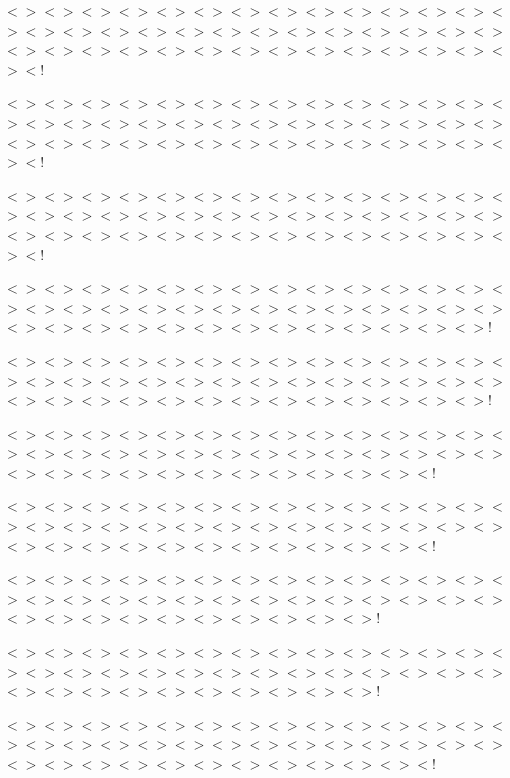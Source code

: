 $<$$>$$<$$>$$<$$>$$<$$>$$<$$>$$<$$>$$<$$>$$<$$>$$<$$>$$<$$>$$<$$>$$<$$>$$<$$>$$<$$>$$<$$>$$<$$>$$<$$>$$<$$>$$<$$>$$<$$>$$<$$>$$<$$>$$<$$>$$<$$>$$<$$>$$<$$>$$<$$>$$<$$>$$<$$>$$<$$>$$<$$>$$<$$>$$<$$>$$<$$>$$<$$>$$<$$>$$<$$>$$<$$>$$<$$>$$<$$>$$<$$>$$<$!

$<$$>$$<$$>$$<$$>$$<$$>$$<$$>$$<$$>$$<$$>$$<$$>$$<$$>$$<$$>$$<$$>$$<$$>$$<$$>$$<$$>$$<$$>$$<$$>$$<$$>$$<$$>$$<$$>$$<$$>$$<$$>$$<$$>$$<$$>$$<$$>$$<$$>$$<$$>$$<$$>$$<$$>$$<$$>$$<$$>$$<$$>$$<$$>$$<$$>$$<$$>$$<$$>$$<$$>$$<$$>$$<$$>$$<$$>$$<$$>$$<$$>$$<$!

$<$$>$$<$$>$$<$$>$$<$$>$$<$$>$$<$$>$$<$$>$$<$$>$$<$$>$$<$$>$$<$$>$$<$$>$$<$$>$$<$$>$$<$$>$$<$$>$$<$$>$$<$$>$$<$$>$$<$$>$$<$$>$$<$$>$$<$$>$$<$$>$$<$$>$$<$$>$$<$$>$$<$$>$$<$$>$$<$$>$$<$$>$$<$$>$$<$$>$$<$$>$$<$$>$$<$$>$$<$$>$$<$$>$$<$$>$$<$$>$$<$$>$$<$!

$<$$>$$<$$>$$<$$>$$<$$>$$<$$>$$<$$>$$<$$>$$<$$>$$<$$>$$<$$>$$<$$>$$<$$>$$<$$>$$<$$>$$<$$>$$<$$>$$<$$>$$<$$>$$<$$>$$<$$>$$<$$>$$<$$>$$<$$>$$<$$>$$<$$>$$<$$>$$<$$>$$<$$>$$<$$>$$<$$>$$<$$>$$<$$>$$<$$>$$<$$>$$<$$>$$<$$>$$<$$>$$<$$>$$<$$>$$<$$>$!

$<$$>$$<$$>$$<$$>$$<$$>$$<$$>$$<$$>$$<$$>$$<$$>$$<$$>$$<$$>$$<$$>$$<$$>$$<$$>$$<$$>$$<$$>$$<$$>$$<$$>$$<$$>$$<$$>$$<$$>$$<$$>$$<$$>$$<$$>$$<$$>$$<$$>$$<$$>$$<$$>$$<$$>$$<$$>$$<$$>$$<$$>$$<$$>$$<$$>$$<$$>$$<$$>$$<$$>$$<$$>$$<$$>$$<$$>$$<$$>$!

$<$$>$$<$$>$$<$$>$$<$$>$$<$$>$$<$$>$$<$$>$$<$$>$$<$$>$$<$$>$$<$$>$$<$$>$$<$$>$$<$$>$$<$$>$$<$$>$$<$$>$$<$$>$$<$$>$$<$$>$$<$$>$$<$$>$$<$$>$$<$$>$$<$$>$$<$$>$$<$$>$$<$$>$$<$$>$$<$$>$$<$$>$$<$$>$$<$$>$$<$$>$$<$$>$$<$$>$$<$$>$$<$$>$$<$!

$<$$>$$<$$>$$<$$>$$<$$>$$<$$>$$<$$>$$<$$>$$<$$>$$<$$>$$<$$>$$<$$>$$<$$>$$<$$>$$<$$>$$<$$>$$<$$>$$<$$>$$<$$>$$<$$>$$<$$>$$<$$>$$<$$>$$<$$>$$<$$>$$<$$>$$<$$>$$<$$>$$<$$>$$<$$>$$<$$>$$<$$>$$<$$>$$<$$>$$<$$>$$<$$>$$<$$>$$<$$>$$<$$>$$<$!

$<$$>$$<$$>$$<$$>$$<$$>$$<$$>$$<$$>$$<$$>$$<$$>$$<$$>$$<$$>$$<$$>$$<$$>$$<$$>$$<$$>$$<$$>$$<$$>$$<$$>$$<$$>$$<$$>$$<$$>$$<$$>$$<$$>$$<$$>$$<$$>$$<$$>$$<$$>$$<$$>$$<$$>$$<$$>$$<$$>$$<$$>$$<$$>$$<$$>$$<$$>$$<$$>$$<$$>$$<$$>$!

$<$$>$$<$$>$$<$$>$$<$$>$$<$$>$$<$$>$$<$$>$$<$$>$$<$$>$$<$$>$$<$$>$$<$$>$$<$$>$$<$$>$$<$$>$$<$$>$$<$$>$$<$$>$$<$$>$$<$$>$$<$$>$$<$$>$$<$$>$$<$$>$$<$$>$$<$$>$$<$$>$$<$$>$$<$$>$$<$$>$$<$$>$$<$$>$$<$$>$$<$$>$$<$$>$$<$$>$$<$$>$!

$<$$>$$<$$>$$<$$>$$<$$>$$<$$>$$<$$>$$<$$>$$<$$>$$<$$>$$<$$>$$<$$>$$<$$>$$<$$>$$<$$>$$<$$>$$<$$>$$<$$>$$<$$>$$<$$>$$<$$>$$<$$>$$<$$>$$<$$>$$<$$>$$<$$>$$<$$>$$<$$>$$<$$>$$<$$>$$<$$>$$<$$>$$<$$>$$<$$>$$<$$>$$<$$>$$<$$>$$<$$>$$<$$>$$<$!

